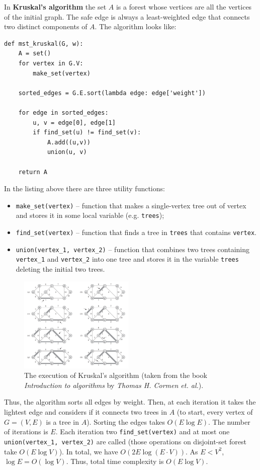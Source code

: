 \documentclass[12pt, a4paper]{article}
\begin{document}
In \textbf{Kruskal's algorithm} the set $A$ is a forest whose vertices are all the vertices of the initial graph. The safe edge is always a least-weighted edge that connects two distinct components of $A$. The algorithm looks like:
\begin{Verbatim}
def mst_kruskal(G, w):
	A = set()
	for vertex in G.V:
		make_set(vertex)
	
	sorted_edges = G.E.sort(lambda edge: edge['weight'])
	
	for edge in sorted_edges:
		u, v = edge[0], edge[1]
		if find_set(u) != find_set(v):
			A.add((u,v))
			union(u, v)
	
	return A
\end{Verbatim}
In the listing above there are three utility functions:
\begin{itemize}
	\item \texttt{make\_set(vertex)} -- function that makes a single-vertex tree out of vertex and stores it in some local variable (e.g. \texttt{trees});
	\item \texttt{find\_set(vertex)} -- function that finds a tree in \texttt{trees} that contains \texttt{vertex}.
	\item \texttt{union(vertex\_1, vertex\_2)} -- function that combines two trees containing \texttt{vertex\_1} and \texttt{vertex\_2} into one tree and stores it in the variable \texttt{trees} deleting the initial two trees.
\end{itemize}

\begin{figure}
\centering
\includegraphics[width=0.49\textwidth]{kruskal.png}
\caption{The execution of Kruskal's algorithm (taken from the book \textit{Introduction to algorithms} by \textit{Thomas H. Cormen et. al.}).}
\end{figure}

Thus, the algorithm sorts all edges by weight. Then, at each iteration it takes the lightest edge and considers if it connects two trees in $A$ (to start, every vertex of $G = (V,E)$ is a tree in $A$). Sorting the edges takes $O(E \log E)$. The number of iterations is $E$. Each iteration two \texttt{find\_set(vertex)} and at most one \texttt{union(vertex\_1, vertex\_2)} are called (those operations on disjoint-set forest take $O(E \log V)$). In total, we have $O(2E \log (E \cdot V))$. As $E < V^2$, $\log E = O(\log V)$. Thus, total time complexity is $O(E \log V)$.
\end{document}
